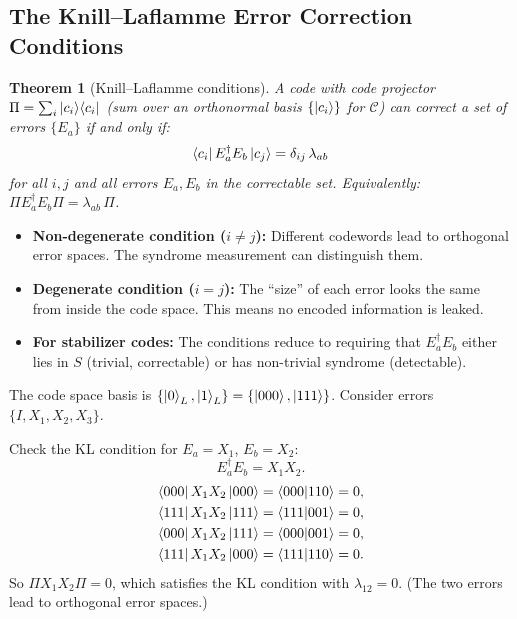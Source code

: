 \documentclass[11pt, a4paper]{article}
\theoremstyle{definition}
\theoremstyle{plain}
\newtheorem{theorem}{Theorem}[section]
\theoremstyle{remark}
\providecommand{\proj}[1]{\ket{#1}\!\bra{#1}}
\begin{document}
\subsection{The Knill--Laflamme Error Correction Conditions}
\label{sec:kl}

\begin{theorem}[Knill--Laflamme conditions]
\label{thm:knill-laflamme}
A code with code projector $\Pi = \sum_i \proj{c_i}$ (sum over an
orthonormal basis $\{\ket{c_i}\}$ for $\mathcal{C}$) can correct a set of
errors $\{E_a\}$ if and only if:
\[
  \bra{c_i} E_a^\dagger E_b \ket{c_j} = \delta_{ij}\, \lambda_{ab}
\]
for all $i, j$ and all errors $E_a, E_b$ in the correctable set.
Equivalently: $\Pi E_a^\dagger E_b \Pi = \lambda_{ab}\,\Pi$.
\end{theorem}

\begin{itemize}
  \item \textbf{Non-degenerate condition ($i\neq j$):} Different codewords
        lead to orthogonal error spaces.  The syndrome measurement can
        distinguish them.
  \item \textbf{Degenerate condition ($i = j$):} The ``size'' of each error
        looks the same from inside the code space.  This means no encoded
        information is leaked.
  \item \textbf{For stabilizer codes:} The conditions reduce to requiring
        that $E_a^\dagger E_b$ either lies in $S$ (trivial, correctable) or
        has non-trivial syndrome (detectable).
\end{itemize}

\begin{workedexample}
The code space basis is $\{\ket{0}_L, \ket{1}_L\} = \{\ket{000}, \ket{111}\}$.
Consider errors $\{I, X_1, X_2, X_3\}$.

Check the KL condition for $E_a = X_1$, $E_b = X_2$:
\[
  E_a^\dagger E_b = X_1 X_2.
\]
\begin{align*}
  \bra{000} X_1 X_2 \ket{000} &= \braket{000|110} = 0,\\
  \bra{111} X_1 X_2 \ket{111} &= \braket{111|001} = 0,\\
  \bra{000} X_1 X_2 \ket{111} &= \braket{000|001} = 0,\\
  \bra{111} X_1 X_2 \ket{000} &= \braket{111|110} = 0.
\end{align*}
So $\Pi X_1 X_2 \Pi = 0$, which satisfies the KL condition with
$\lambda_{12} = 0$.  (The two errors lead to orthogonal error spaces.)
\end{workedexample}
\end{document}
